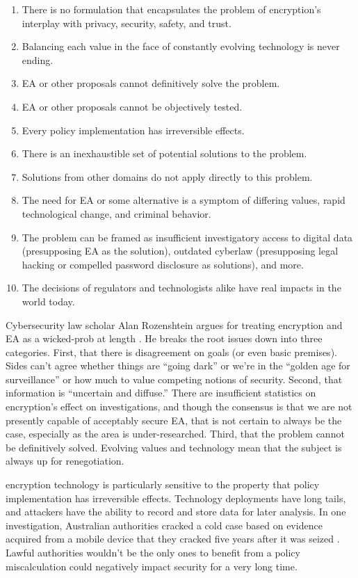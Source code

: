 \begin{enumerate}
  \item There is no formulation that encapsulates the problem of encryption's interplay with privacy, security,
        safety, and trust.
  \item Balancing each value in the face of constantly evolving technology is never ending.
  \item \ac{EA} or other proposals cannot definitively solve the problem.
  \item \ac{EA} or other proposals cannot be objectively tested.
  \item Every policy implementation has irreversible effects.
  \item There is an inexhaustible set of potential solutions to the problem.
  \item Solutions from other domains do not apply directly to this problem.
  \item The need for \ac{EA} or some alternative is a symptom of differing values, rapid technological change, and
        criminal behavior.
  \item The problem can be framed as insufficient investigatory access to digital data (presupposing \ac{EA} as the
        solution), outdated cyberlaw (presupposing legal hacking or compelled password disclosure as solutions), and
        more.
  \item The decisions of regulators and technologists alike have real impacts in the world today.
\end{enumerate}

Cybersecurity law scholar Alan Rozenshtein argues for treating \ac{encryption} and \ac{EA} as a \ac{wicked-prob} at
length \cite{rozenshtein_wicked_2018}. He breaks the root issues down into three categories. First, that there is
disagreement on goals (or even basic premises). Sides can't agree whether things are ``going dark'' or we're in the
``golden age for surveillance'' or how much to value competing notions of security. Second, that information is
``uncertain and diffuse.'' There are insufficient statistics on encryption's effect on investigations, and though the
consensus is that we are not presently capable of acceptably secure \ac{EA}, that is not certain to always be the case,
especially as the area is under-researched. Third, that the problem cannot be definitively solved. Evolving values and
technology mean that the subject is always up for renegotiation.

\Ac{encryption} technology is particularly sensitive to the property that policy implementation has irreversible
effects. Technology deployments have long tails, and attackers have the ability to record and store data for later
analysis. In one investigation, Australian authorities cracked a cold case based on evidence acquired from a mobile
device that they cracked five years after it was seized \cite{evans_arrests_2020}. Lawful authorities wouldn't be the
only ones to benefit from a policy miscalculation could negatively impact security for a very long time.

